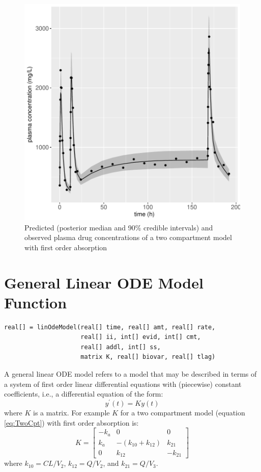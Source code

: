 \documentclass[11pt, reqno]{amsbook}
\numberwithin{section}{chapter}
\theoremstyle{remark}
\begin{document}
\begin{figure}[htbp]
\centering
\includegraphics[width=0.6\linewidth]{../example-models/R/deliv/figure/TwoCptModel/TwoCptModelPlots006.pdf}
\caption{\label{fig:org378ba74}
Predicted (posterior median and 90\% credible intervals) and observed plasma drug concentrations of a two compartment model with first order absorption}
\end{figure}


\section{General Linear ODE Model Function}
\label{sec:org72f0d28}
\begin{verbatim}
real[] = linOdeModel(real[] time, real[] amt, real[] rate,
                     real[] ii, int[] evid, int[] cmt,
                     real[] addl, int[] ss,
                     matrix K, real[] biovar, real[] tlag)
\end{verbatim}
A general linear ODE model refers to a model that may be described in
terms of a system of first order linear differential equations with
(piecewise) constant coefficients, i.e., a differential equation of
the form:
\begin{equation}
y^\prime\left(t\right) = Ky\left(t\right)
\end{equation}
where \(K\) is a matrix. For example \(K\) for a two compartment model
(equation \eqref{eq:TwoCpt}) with first order absorption is:
\begin{equation}
  K = \left[\begin{array}{ccc}
              -k_a & 0 & 0 \\
              k_a & -\left(k_{10} + k_{12}\right) & k_{21} \\
              0 & k_{12} & -k_{21}
            \end{array}\right]
\end{equation}
where \(k_{10}=CL/V_2\), \(k_{12}=Q/V_2\), and \(k_{21}=Q/V_3\).
\end{document}
